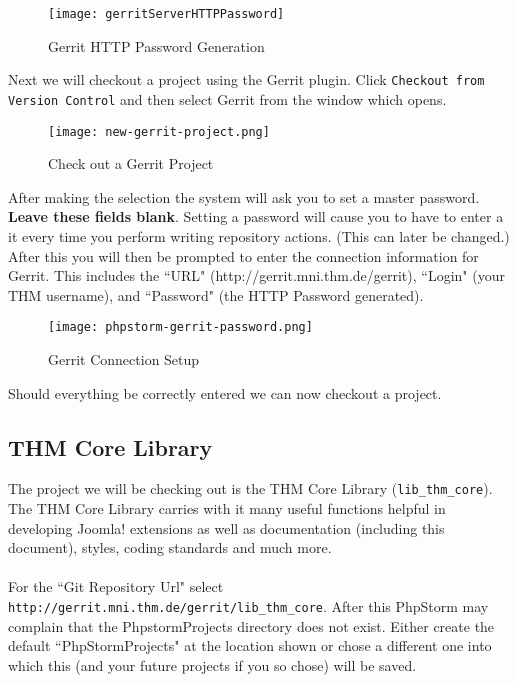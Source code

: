 \begin{figure}[h]
	\centering
	\texttt{[image: gerritServerHTTPPassword]}
	\caption{Gerrit HTTP Password Generation}
	\label{fig:gerrit-password-creation}
\end{figure}

\noindent
Next we will checkout a project using the Gerrit plugin. Click \texttt{Checkout from Version Control} and then select Gerrit from the window which opens.

\begin{figure}[h] 
	\centering
	\texttt{[image: new-gerrit-project.png]}
	\caption{Check out a Gerrit Project}
\end{figure}

\noindent
After making the selection the system will ask you to set a master password. \textbf{Leave these fields blank}. Setting a password will cause you to have to enter a it every time you perform writing repository actions. (This can later be changed.) After this you will then be prompted to enter the connection information for Gerrit. This includes the ``URL" (http://gerrit.mni.thm.de/gerrit), ``Login" (your THM username), and ``Password" (the HTTP Password generated). 

\begin{figure}[h] 
	\centering
	\texttt{[image: phpstorm-gerrit-password.png]}
	\caption{Gerrit Connection Setup}
\end{figure}

\noindent
Should everything be correctly entered we can now checkout a project.


\subsection{THM Core Library}
\label{subsec:Core_library}
The project we will be checking out is the THM Core Library (\texttt{lib\_thm\_core}). The THM Core Library carries with it many useful functions helpful in developing Joomla! extensions as well as documentation (including this document), styles, coding standards and much more.\\
\\
For the ``Git Repository Url" select \texttt{http://gerrit.mni.thm.de/gerrit/lib\_thm\_core}. After this PhpStorm may complain that the PhpstormProjects directory does not exist. Either create the default ``PhpStormProjects" at the location shown or chose a different one into which this (and your future projects if you so chose) will be saved.

